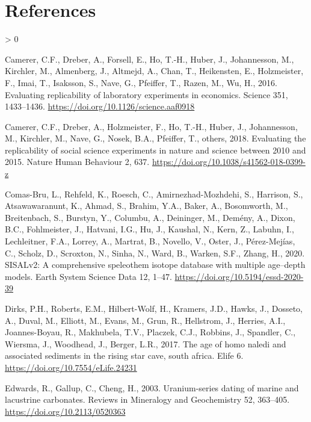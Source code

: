 \documentclass[]{elsarticle} %
\newlength{\cslhangindent}
\newenvironment{CSLReferences}[2] %
 {%
  \setlength{\parindent}{0pt}
  \ifodd #1 \everypar{\setlength{\hangindent}{\cslhangindent}}\ignorespaces\fi
  \ifnum #2 > 0
  \setlength{\parskip}{#2\baselineskip}
  \fi
 }%
 {}
\begin{document}
\nolinenumbers

\hypertarget{references}{%
\section*{References}\label{references}}

\hypertarget{refs}{}
\begin{CSLReferences}{1}{0}
\leavevmode\hypertarget{ref-Camerer1433}{}%
Camerer, C.F., Dreber, A., Forsell, E., Ho, T.-H., Huber, J., Johannesson, M., Kirchler, M., Almenberg, J., Altmejd, A., Chan, T., Heikensten, E., Holzmeister, F., Imai, T., Isaksson, S., Nave, G., Pfeiffer, T., Razen, M., Wu, H., 2016. Evaluating replicability of laboratory experiments in economics. Science 351, 1433--1436. \url{https://doi.org/10.1126/science.aaf0918}

\leavevmode\hypertarget{ref-camerer2018evaluating}{}%
Camerer, C.F., Dreber, A., Holzmeister, F., Ho, T.-H., Huber, J., Johannesson, M., Kirchler, M., Nave, G., Nosek, B.A., Pfeiffer, T., others, 2018. Evaluating the replicability of social science experiments in nature and science between 2010 and 2015. Nature Human Behaviour 2, 637. \url{https://doi.org/10.1038/s41562-018-0399-z}

\leavevmode\hypertarget{ref-ComasBru2020SISALv2AC}{}%
Comas-Bru, L., Rehfeld, K., Roesch, C., Amirnezhad-Mozhdehi, S., Harrison, S., Atsawawaranunt, K., Ahmad, S., Brahim, Y.A., Baker, A., Bosomworth, M., Breitenbach, S., Burstyn, Y., Columbu, A., Deininger, M., Demény, A., Dixon, B.C., Fohlmeister, J., Hatvani, I.G., Hu, J., Kaushal, N., Kern, Z., Labuhn, I., Lechleitner, F.A., Lorrey, A., Martrat, B., Novello, V., Oster, J., Pérez-Mejías, C., Scholz, D., Scroxton, N., Sinha, N., Ward, B., Warken, S.F., Zhang, H., 2020. SISALv2: A comprehensive speleothem isotope database with multiple age--depth models. Earth System Science Data 12, 1--47. \url{https://doi.org/10.5194/essd-2020-39}

\leavevmode\hypertarget{ref-Dirks2017}{}%
Dirks, P.H., Roberts, E.M., Hilbert-Wolf, H., Kramers, J.D., Hawks, J., Dosseto, A., Duval, M., Elliott, M., Evans, M., Grun, R., Hellstrom, J., Herries, A.I., Joannes-Boyau, R., Makhubela, T.V., Placzek, C.J., Robbins, J., Spandler, C., Wiersma, J., Woodhead, J., Berger, L.R., 2017. The age of homo naledi and associated sediments in the rising star cave, south africa. Elife 6. \url{https://doi.org/10.7554/eLife.24231}

\leavevmode\hypertarget{ref-RN4495}{}%
Edwards, R., Gallup, C., Cheng, H., 2003. Uranium-series dating of marine and lacustrine carbonates. Reviews in Mineralogy and Geochemistry 52, 363--405. \url{https://doi.org/10.2113/0520363}


\end{CSLReferences}
\end{document}
